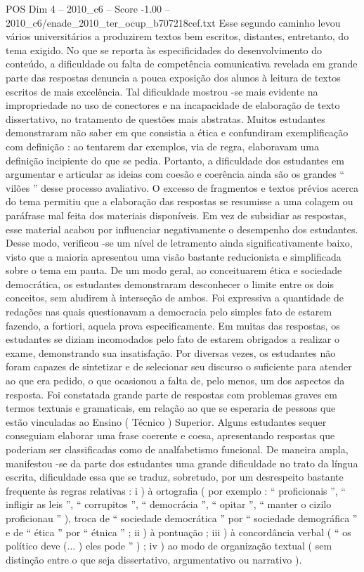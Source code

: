 \begin{textsample}{POS Dim 4 – 2010\_c6 – Score -1.00 – 2010\_c6/enade\_2010\_ter\_ocup\_b707218cef.txt}
Esse segundo caminho levou vários universitários a produzirem textos bem escritos, distantes, entretanto, do tema exigido.
No que se reporta às especificidades do desenvolvimento do conteúdo, a dificuldade ou falta de competência comunicativa revelada em grande parte das respostas denuncia a pouca exposição dos alunos à leitura de textos escritos de mais excelência.
Tal dificuldade mostrou -se mais evidente na impropriedade no uso de conectores e na incapacidade de elaboração de texto dissertativo, no tratamento de questões mais abstratas.
Muitos estudantes demonstraram não saber em que consistia a ética e confundiram exemplificação com definição : ao tentarem dar exemplos, via de regra, elaboravam uma definição incipiente do que se pedia.
Portanto, a dificuldade dos estudantes em argumentar e articular as ideias com coesão e coerência ainda são os grandes “ vilões ” desse processo avaliativo.
O excesso de fragmentos e textos prévios acerca do tema permitiu que a elaboração das respostas se resumisse a uma colagem ou paráfrase mal feita dos materiais disponíveis.
Em vez de subsidiar as respostas, esse material acabou por influenciar negativamente o desempenho dos estudantes.
Desse modo, verificou -se um nível de letramento ainda significativamente baixo, visto que a maioria apresentou uma visão bastante reducionista e simplificada sobre o tema em pauta.
De um modo geral, ao conceituarem ética e sociedade democrática, os estudantes demonstraram desconhecer o limite entre os dois conceitos, sem aludirem à interseção de ambos.
Foi expressiva a quantidade de redações nas quais questionavam a democracia pelo simples fato de estarem fazendo, a fortiori, aquela prova especificamente.
Em muitas das respostas, os estudantes se diziam incomodados pelo fato de estarem obrigados a realizar o exame, demonstrando sua insatisfação.
Por diversas vezes, os estudantes não foram capazes de sintetizar e de selecionar seu discurso o suficiente para atender ao que era pedido, o que ocasionou a falta de, pelo menos, um dos aspectos da resposta.
Foi constatada grande parte de respostas com problemas graves em termos textuais e gramaticais, em relação ao que se esperaria de pessoas que estão vinculadas ao Ensino ( Técnico ) Superior.
Alguns estudantes sequer conseguiam elaborar uma frase coerente e coesa, apresentando respostas que poderiam ser classificadas como de analfabetismo funcional.
De maneira ampla, manifestou -se da parte dos estudantes uma grande dificuldade no trato da língua escrita, dificuldade essa que se traduz, sobretudo, por um desrespeito bastante frequente às regras relativas : i ) à ortografia ( por exemplo : “ proficionais ”, “ infligir as leis ”, “ corrupitos ”, “ democrácia ”, “ opitar ”, “ manter o cizilo proficionau ” ), troca de “ sociedade democrática ” por “ sociedade demográfica ” e de “ ética ” por “ étnica ” ; ii ) à pontuação ; iii ) à concordância verbal ( “ os político deve (... ) eles pode ” ) ; iv ) ao modo de organização textual ( sem distinção entre o que seja dissertativo, argumentativo ou narrativo ).

\end{textsample}
